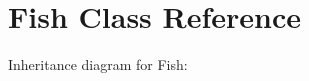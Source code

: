 \hypertarget{class_fish}{}\section{Fish Class Reference}
\label{class_fish}


Inheritance diagram for Fish\+:
